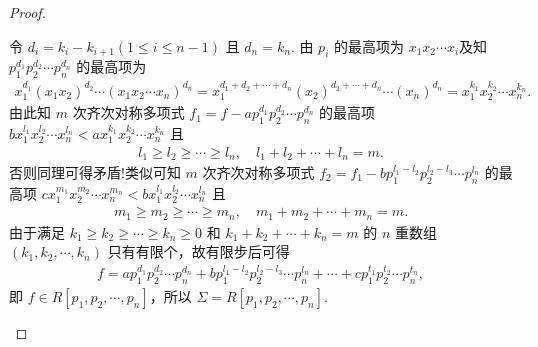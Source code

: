 \documentclass[../../main.tex]{subfiles}%
\begin{document}
\begin{proof}
\begin{enumerate}[(1)]
令 \( d_i = k_i - k_{i+1} (1 \leqslant i \leqslant n - 1) \) 且 \( d_n = k_n \). 由 \( p_i \) 的最高项为 \( x_1 x_2 \cdots x_i \)及知 \( p_1^{d_1} p_2^{d_2} \cdots p_n^{d_n} \) 的最高项为
\begin{align*}
x_1^{d_1} (x_1 x_2)^{d_2} \cdots (x_1 x_2 \cdots x_n)^{d_n} 
= x_1^{d_1 + d_2 + \cdots + d_n} (x_2)^{d_2 + \cdots + d_n} \cdots (x_n)^{d_n} 
= x_1^{k_1} x_2^{k_2} \cdots x_n^{k_n}.
\end{align*}
由此知 \( m \) 次齐次对称多项式 \( f_1 = f - a p_1^{d_1} p_2^{d_2} \cdots p_n^{d_n} \) 的最高项 \( b x_1^{l_1} x_2^{l_2} \cdots x_n^{l_n} < a x_1^{k_1} x_2^{k_2} \cdots x_n^{k_n} \) 且
\begin{align*}
l_1 \geqslant l_2 \geqslant \cdots \geqslant l_n, \quad l_1 + l_2 + \cdots + l_n = m.
\end{align*}
否则同理可得矛盾!类似可知 \( m \) 次齐次对称多项式 \( f_2 = f_1 - b p_1^{l_1 - l_2} p_2^{l_2 - l_3} \cdots p_n^{l_n} \) 的最高项 \( c x_1^{m_1} x_2^{m_2} \cdots x_n^{m_n} < b x_1^{l_1} x_2^{l_2} \cdots x_n^{l_n} \) 且
\begin{align*}
m_1 \geqslant m_2 \geqslant \cdots \geqslant m_n, \quad m_1 + m_2 + \cdots + m_n = m.
\end{align*}
由于满足 \( k_1 \geqslant k_2 \geqslant \cdots \geqslant k_n \geqslant 0 \) 和 \( k_1 + k_2 + \cdots + k_n = m \) 的 \( n \) 重数组 \( (k_1, k_2, \cdots, k_n) \) 只有有限个，故有限步后可得
\begin{align*}
f = a p_1^{d_1} p_2^{d_2} \cdots p_n^{d_n} + b p_1^{l_1 - l_2} p_2^{l_2 - l_3} \cdots p_n^{l_n} + \cdots + c p_1^{t_1} p_2^{t_2} \cdots p_n^{t_n},
\end{align*}
即 \( f \in R[p_1, p_2, \cdots, p_n] \)，所以 \( \Sigma = R[p_1, p_2, \cdots, p_n] \).


\end{enumerate}
\end{proof}
\end{document}
